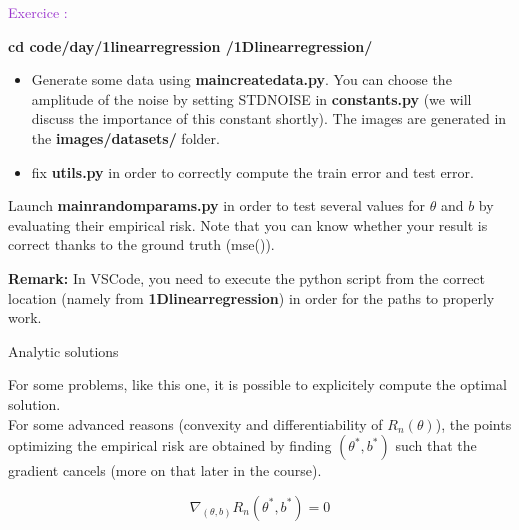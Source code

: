 \documentclass[usenames,dvipsnames,french]{beamer}
\newcounter{numexos}%
\newcommand{\exercice}[1]{%
\addtocounter{numexos}{1}%
\textcolor{DarkOrchid}{Exercice\,\thenumexos\,:}\,#1%
}
\begin{document}
\begin{frame}

    \exercice{}

    \textbf{cd code/day/1\textunderscore linear\textunderscore regression /1D\textunderscore linear\textunderscore regression/}

    \begin{itemize}
    	\item Generate some data using \textbf{main\textunderscore create\textunderscore data.py}. You can choose the amplitude of the noise by setting STD\textunderscore NOISE in \textbf{constants.py} (we will discuss the importance of this constant shortly). The images are generated in the \textbf{images/datasets/} folder.
    \item fix \textbf{utils.py} in order to correctly compute the train error and test error.
    \end{itemize}

    Launch \textbf{main\textunderscore random\textunderscore params.py} in order to test several values for $\theta$ and $b$ by evaluating their empirical risk. Note that you can know whether your result is correct thanks to the ground truth (mse()).

    \textbf{Remark:} In VSCode, you need to execute the python script from the correct location (namely from \textbf{1D\textunderscore linear\textunderscore regression}) in order for the paths to properly work.

\end{frame}

\begin{frame}{Analytic solutions}

    For some problems, like this one, it is possible to explicitely compute the
    optimal solution.
    \\

    For some advanced reasons (convexity and differentiability of
    $R_n(\theta)$), the points optimizing the empirical risk are obtained by
    finding $ (\theta^*, b^*)$ such that the gradient cancels (more on that
    later in the course).

    \begin{equation}
        \nabla_{(\theta, b)} R_n(\theta^*, b^*) = 0
    \end{equation}
\end{frame}
\end{document}

